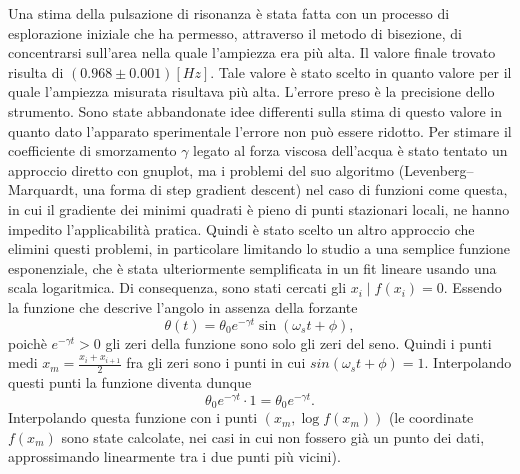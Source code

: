 Una stima della pulsazione di risonanza è stata fatta con un processo di esplorazione iniziale che ha permesso, attraverso
il metodo di bisezione, di concentrarsi sull'area nella quale l'ampiezza era più alta. Il valore finale trovato risulta di $(0.968 \pm 0.001) [Hz]$.
 Tale valore è stato scelto in quanto valore per il quale l'ampiezza misurata risultava più alta. L'errore preso è la precisione dello
 strumento. Sono state abbandonate idee differenti sulla stima di questo valore in quanto dato l'apparato sperimentale l'errore non
 può essere ridotto.
Per stimare il coefficiente di smorzamento $\gamma$ legato al forza viscosa dell'acqua è stato tentato un approccio diretto con gnuplot, 
ma i problemi del suo algoritmo (Levenberg–Marquardt, una forma di step gradient descent) nel caso di funzioni come questa, in cui il gradiente 
dei minimi quadrati è pieno di punti 
stazionari locali, ne hanno impedito l'applicabilità pratica. Quindi è stato scelto un altro approccio che elimini questi problemi, in particolare limitando lo
studio a una semplice funzione esponenziale, che è stata ulteriormente semplificata in un fit lineare usando una scala logaritmica.
Di consequenza, sono stati cercati gli $x_i \mid f(x_i)=0$. Essendo la funzione che descrive l'angolo in assenza della forzante
\begin{equation}
	\theta(t) = \theta_0 e^{-\gamma t} \sin(\omega_s t + \phi),
\end{equation}
poichè $e^{-\gamma t} > 0$ gli zeri della funzione sono solo gli zeri del seno. Quindi i punti medi 
$x_m = \frac{x_i + x_{i+1}}{2}$ fra gli zeri sono i punti in cui $sin(\omega_s t + \phi) = 1$.
Interpolando questi punti la funzione diventa dunque
\[
	\theta_0 e^{-\gamma t} \cdot 1 = \theta_0 e^{-\gamma t}.
\]
Interpolando questa funzione con i punti $(x_m,\log{f(x_m)})$ (le coordinate $f(x_m)$ sono state calcolate, nei casi in cui non fossero già un punto dei dati,
approssimando linearmente tra i due punti più vicini).

